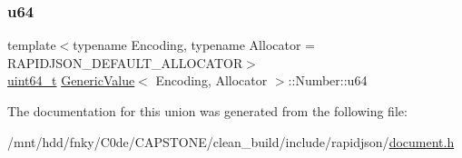 \subsubsection{\texorpdfstring{u64}{u64}}
{\footnotesize\ttfamily template$<$typename Encoding, typename Allocator = R\+A\+P\+I\+D\+J\+S\+O\+N\+\_\+\+D\+E\+F\+A\+U\+L\+T\+\_\+\+A\+L\+L\+O\+C\+A\+T\+OR$>$ \\
\hyperlink{stdint_8h_aec6fcb673ff035718c238c8c9d544c47}{uint64\+\_\+t} \hyperlink{classGenericValue}{Generic\+Value}$<$ Encoding, Allocator $>$\+::Number\+::u64}



The documentation for this union was generated from the following file\+:\begin{DoxyCompactItemize}
\item 
/mnt/hdd/fnky/\+C0de/\+C\+A\+P\+S\+T\+O\+N\+E/clean\+\_\+build/include/rapidjson/\hyperlink{document_8h}{document.\+h}\end{DoxyCompactItemize}
